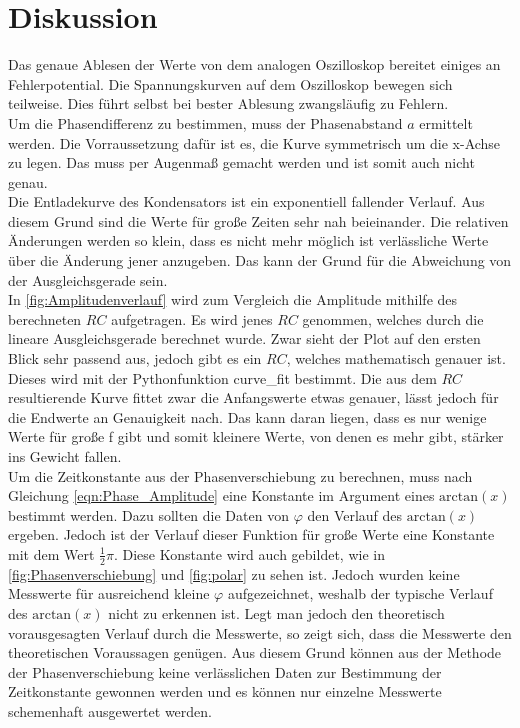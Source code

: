 %

%
\section{Diskussion}

Das genaue Ablesen der Werte von dem analogen Oszilloskop bereitet einiges an Fehlerpotential. 
Die Spannungskurven auf dem Oszilloskop bewegen sich teilweise. Dies führt selbst bei bester Ablesung zwangsläufig zu Fehlern. 
\\
Um die Phasendifferenz zu bestimmen, muss der Phasenabstand $a$ ermittelt werden. Die Vorraussetzung dafür ist es, die 
Kurve symmetrisch um die x-Achse zu legen. Das muss per Augenmaß gemacht werden und ist somit auch nicht genau.
\\
Die Entladekurve des Kondensators ist ein exponentiell fallender Verlauf. Aus diesem Grund sind die Werte für große Zeiten 
sehr nah beieinander. Die relativen Änderungen werden so klein, dass es nicht mehr möglich ist verlässliche Werte über die 
Änderung jener anzugeben. Das kann der Grund für die Abweichung von der Ausgleichsgerade sein.
\\
In \autoref{fig:Amplitudenverlauf} wird zum Vergleich die Amplitude mithilfe des berechneten $RC$ aufgetragen. 
Es wird jenes $RC$ genommen, welches durch die lineare Ausgleichsgerade berechnet wurde. Zwar sieht der Plot auf den ersten Blick 
sehr passend aus, jedoch gibt es ein $RC$, welches mathematisch genauer ist. Dieses wird mit der Pythonfunktion curve\_fit 
bestimmt. Die aus dem $RC$ resultierende Kurve fittet zwar die Anfangswerte etwas genauer, lässt jedoch für die Endwerte an 
Genauigkeit nach. Das kann daran liegen, dass es nur wenige Werte für große f gibt und somit kleinere Werte, von denen es 
mehr gibt, stärker ins Gewicht fallen. 
\\
Um die Zeitkonstante aus der Phasenverschiebung zu berechnen, muss nach Gleichung \eqref{eqn:Phase_Amplitude} eine Konstante 
im Argument eines $\text{arctan}(x)$ bestimmt werden. Dazu sollten die Daten von $\varphi$ den Verlauf des 
$\text{arctan}(x)$ ergeben. Jedoch ist der Verlauf dieser Funktion für große Werte eine Konstante mit dem Wert $\frac{1}{2} \pi$.
Diese Konstante wird auch gebildet, wie in \ref{fig:Phasenverschiebung} und \ref{fig:polar} zu sehen ist. 
Jedoch wurden keine Messwerte für ausreichend kleine $\varphi$ aufgezeichnet, weshalb der typische Verlauf des $\text{arctan}(x)$
nicht zu erkennen ist. Legt man jedoch den theoretisch vorausgesagten Verlauf durch die Messwerte, so zeigt sich, dass 
die Messwerte den theoretischen Voraussagen genügen.
Aus diesem Grund können aus der Methode der Phasenverschiebung keine verlässlichen Daten zur Bestimmung 
der Zeitkonstante gewonnen werden und es können nur einzelne Messwerte schemenhaft ausgewertet werden.
\label{sec:Diskussion}


%
